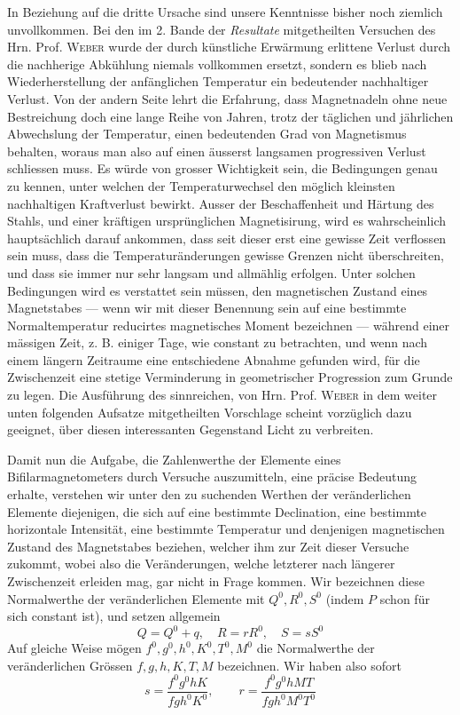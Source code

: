 In Beziehung auf die dritte Ursache sind unsere Kenntnisse bisher noch ziemlich unvollkommen. Bei den im 2. Bande der \textit{Resultate} mitgetheilten Versuchen des Hrn. Prof. \textsc{Weber} wurde der durch künstliche Erwärmung erlittene Verlust durch die nachherige Abkühlung niemals vollkommen ersetzt, sondern
es blieb nach Wiederherstellung der anfänglichen Temperatur ein bedeutender nachhaltiger Verlust. Von der andern Seite lehrt die Erfahrung, dass Magnetnadeln ohne neue Bestreichung doch eine lange Reihe von Jahren, trotz der täglichen und jährlichen Abwechslung der Temperatur, einen bedeutenden Grad von Magnetismus behalten, woraus man also auf einen äusserst langsamen progressiven Verlust schliessen muss. Es würde von grosser Wichtigkeit sein, die Bedingungen genau zu kennen, unter welchen der Temperaturwechsel den möglich kleinsten nachhaltigen Kraftverlust bewirkt. Ausser der Beschaffenheit und Härtung des Stahls, und einer kräftigen ursprünglichen Magnetisirung, wird es wahrscheinlich hauptsächlich darauf ankommen, dass seit dieser erst eine gewisse Zeit verflossen sein muss, dass die Temperaturänderungen gewisse Grenzen nicht überschreiten, und dass sie immer nur sehr langsam und allmählig erfolgen. Unter solchen Bedingungen wird es verstattet sein müssen, den magnetischen Zustand eines Magnetstabes --- wenn wir mit dieser Benennung sein auf eine bestimmte Normaltemperatur reducirtes magnetisches Moment bezeichnen --- während einer mässigen Zeit, z. B. einiger Tage, wie constant zu betrachten, und wenn nach einem längern Zeitraume eine entschiedene Abnahme gefunden wird, für die Zwischenzeit eine stetige Verminderung in geometrischer Progression zum Grunde zu legen. Die Ausführung des sinnreichen, von Hrn. Prof. \textsc{Weber} in dem weiter unten folgenden Aufsatze mitgetheilten Vorschlage scheint vorzüglich dazu geeignet, über diesen interessanten Gegenstand Licht zu verbreiten.

Damit nun die Aufgabe, die Zahlenwerthe der Elemente eines Bifilarmagnetometers durch Versuche auszumitteln, eine präcise Bedeutung erhalte, verstehen wir unter den zu suchenden Werthen der veränderlichen Elemente diejenigen, die sich auf eine bestimmte Declination, eine bestimmte horizontale Intensität, eine bestimmte Temperatur und denjenigen magnetischen Zustand des
Magnetstabes beziehen, welcher ihm zur Zeit dieser Versuche zukommt, wobei also die Veränderungen, welche letzterer nach längerer Zwischenzeit erleiden mag, gar nicht in Frage kommen. Wir bezeichnen diese Normalwerthe der veränderlichen Elemente mit $Q^0,R^0,S^0$ (indem $P$ schon für sich constant ist), und setzen allgemein
\[
Q=Q^0+q,\quad R=rR^0,\quad S=sS^0
\]
Auf gleiche Weise mögen $f^0,g^0,h^0,K^0,T^0,M^0$ die Normalwerthe der veränderlichen Grössen $f,g,h,K,T,M$ bezeichnen. Wir haben also sofort
\[
s=\frac{f^0g^0hK}{fgh^0K^0},\qquad r=\frac{f^0g^0hMT}{fgh^0M^0T^0}
\]

